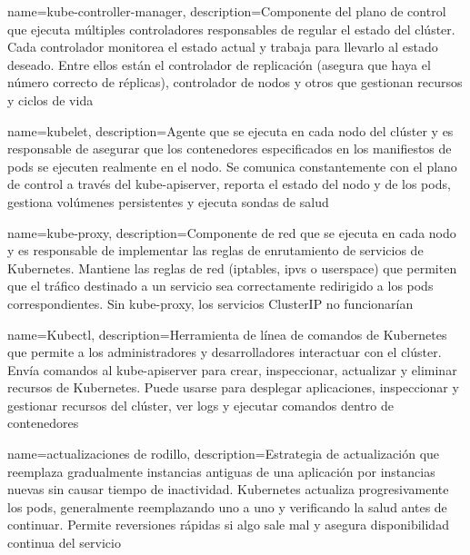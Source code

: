 {
    name={kube-controller-manager},
    description={Componente del plano de control que ejecuta múltiples controladores responsables de regular el estado del clúster. Cada controlador monitorea el estado actual y trabaja para llevarlo al estado deseado. Entre ellos están el controlador de replicación (asegura que haya el número correcto de réplicas), controlador de nodos y otros que gestionan recursos y ciclos de vida \citep{kubernetes2025controller-manager}}
}

{
    name={kubelet},
    description={Agente que se ejecuta en cada nodo del clúster y es responsable de asegurar que los contenedores especificados en los manifiestos de pods se ejecuten realmente en el nodo. Se comunica constantemente con el plano de control a través del kube-apiserver, reporta el estado del nodo y de los pods, gestiona volúmenes persistentes y ejecuta sondas de salud \citep{kubernetes2025kubelet}}
}

{
    name={kube-proxy},
    description={Componente de red que se ejecuta en cada nodo y es responsable de implementar las reglas de enrutamiento de servicios de Kubernetes. Mantiene las reglas de red (iptables, ipvs o userspace) que permiten que el tráfico destinado a un servicio sea correctamente redirigido a los pods correspondientes. Sin kube-proxy, los servicios ClusterIP no funcionarían \citep{kubernetes2025kube-proxy}}
}

{
    name={Kubectl},
    description={Herramienta de línea de comandos de Kubernetes que permite a los administradores y desarrolladores interactuar con el clúster. Envía comandos al kube-apiserver para crear, inspeccionar, actualizar y eliminar recursos de Kubernetes. Puede usarse para desplegar aplicaciones, inspeccionar y gestionar recursos del clúster, ver logs y ejecutar comandos dentro de contenedores \citep{kubernetes2025kubectl}}
}

{
    name={actualizaciones de rodillo},
    description={Estrategia de actualización que reemplaza gradualmente instancias antiguas de una aplicación por instancias nuevas sin causar tiempo de inactividad. Kubernetes actualiza progresivamente los pods, generalmente reemplazando uno a uno y verificando la salud antes de continuar. Permite reversiones rápidas si algo sale mal y asegura disponibilidad continua del servicio \citep{kubernetes2025rolling-updates}}
}

